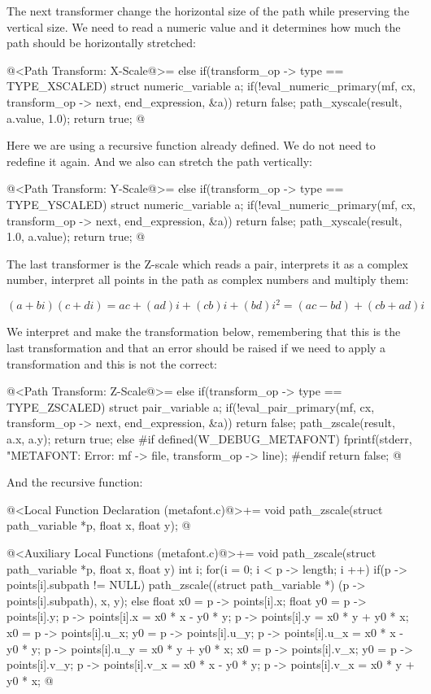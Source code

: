 The next transformer change the horizontal size of the path while
preserving the vertical size. We need to read a numeric value and it
determines how much the path should be horizontally stretched:

\iniciocodigo
@<Path Transform: X-Scale@>=
else if(transform_op -> type == TYPE_XSCALED){
  struct numeric_variable a;
  if(!eval_numeric_primary(mf, cx, transform_op -> next, end_expression,
                           &a))
    return false;
  path_xyscale(result, a.value, 1.0);  
  return true;
}
@
\fimcodigo

Here we are using a recursive function already defined. We do not need
to redefine it again. And we also can stretch the path vertically:

\iniciocodigo
@<Path Transform: Y-Scale@>=
else if(transform_op -> type == TYPE_YSCALED){
  struct numeric_variable a;
  if(!eval_numeric_primary(mf, cx, transform_op -> next, end_expression,
                           &a))
    return false;
  path_xyscale(result, 1.0, a.value);  
  return true;
}
@
\fimcodigo

The last transformer is the Z-scale which reads a pair, interprets it
as a complex number, interpret all points in the path as complex
numbers and multiply them:

$$
(a+bi)(c+di) = ac + (ad)i + (cb)i + (bd)i^2 = (ac - bd) + (cb+ad)i
$$

We interpret and make the transformation below, remembering that this
is the last transformation and that an error should be raised if we
need to apply a transformation and this is not the correct:


\iniciocodigo
@<Path Transform: Z-Scale@>=
else if(transform_op -> type == TYPE_ZSCALED){
  struct pair_variable a;
  if(!eval_pair_primary(mf, cx, transform_op -> next, end_expression, &a))
    return false;
  path_zscale(result, a.x, a.y);  
  return true;
}
else{
#if defined(W_DEBUG_METAFONT)
  fprintf(stderr, "METAFONT: Error: %
          mf -> file, transform_op -> line);
#endif
  return false;
}
@
\fimcodigo

And the recursive function:

\iniciocodigo
@<Local Function Declaration (metafont.c)@>+=
void path_zscale(struct path_variable *p, float x, float y);
@
\fimcodigo

\iniciocodigo
@<Auxiliary Local Functions (metafont.c)@>+=
void path_zscale(struct path_variable *p, float x, float y){
  int i;
  for(i = 0; i < p -> length; i ++){
    if(p -> points[i].subpath != NULL)
      path_zscale((struct path_variable *) (p -> points[i].subpath),
                  x, y);
    else{
      float x0 = p -> points[i].x;
      float y0 = p -> points[i].y;
      p -> points[i].x = x0 * x - y0 * y;
      p -> points[i].y = x0 * y + y0 * x;
      x0 = p -> points[i].u_x;
      y0 = p -> points[i].u_y;
      p -> points[i].u_x = x0 * x - y0 * y;
      p -> points[i].u_y = x0 * y + y0 * x;
      x0 = p -> points[i].v_x;
      y0 = p -> points[i].v_y;
      p -> points[i].v_x = x0 * x - y0 * y;
      p -> points[i].v_x = x0 * y + y0 * x;
    }
  }
}
@
\fimcodigo

